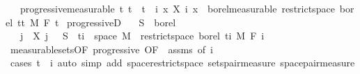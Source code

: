 \begin{isabellebody}
\ \ \ progressive{\isacharbrackleft}{\kern0pt}measurable{\isacharbrackright}{\kern0pt}{\isacharcolon}{\kern0pt}\ {\isachardoublequoteopen}{\isasymAnd}t{\isachardot}{\kern0pt}\ t\ {\isasymle}\ t\ {\isasymLongrightarrow}\ {\isacharparenleft}{\kern0pt}{\isasymlambda}{\isacharparenleft}{\kern0pt}i{\isacharcomma}{\kern0pt}\ x{\isacharparenright}{\kern0pt}{\isachardot}{\kern0pt}\ X\ i\ x{\isacharparenright}{\kern0pt}\ {\isasymin}\ borel{\isacharunderscore}{\kern0pt}measurable\ {\isacharparenleft}{\kern0pt}restrict{\isacharunderscore}{\kern0pt}space\ borel\ {\isacharbraceleft}{\kern0pt}tt{\isacharbraceright}{\kern0pt}\ {\isasymOtimes}\isactrlsub M\ F\ t{\isacharparenright}{\kern0pt}{\isachardoublequoteclose}\isanewline
{}\isanewline
\isanewline
{}\isamarkupfalse%
\ progressiveD{\isacharcolon}{\kern0pt}\isanewline
\ \ \ {\isachardoublequoteopen}S\ {\isasymin}\ borel{\isachardoublequoteclose}\isanewline
\ \ \ {\isachardoublequoteopen}{\isacharparenleft}{\kern0pt}{\isasymlambda}{\isacharparenleft}{\kern0pt}j{\isacharcomma}{\kern0pt}\ {\isasymxi}{\isacharparenright}{\kern0pt}{\isachardot}{\kern0pt}\ X\ j\ {\isasymxi}{\isacharparenright}{\kern0pt}\ {\isacharminus}{\kern0pt}{\isacharbackquote}{\kern0pt}\ S\ {\isasyminter}\ {\isacharparenleft}{\kern0pt}{\isacharbraceleft}{\kern0pt}ti{\isacharbraceright}{\kern0pt}\ {\isasymtimes}\ space\ M{\isacharparenright}{\kern0pt}\ {\isasymin}\ {\isacharparenleft}{\kern0pt}restrict{\isacharunderscore}{\kern0pt}space\ borel\ {\isacharbraceleft}{\kern0pt}ti{\isacharbraceright}{\kern0pt}\ {\isasymOtimes}\isactrlsub M\ F\ i{\isacharparenright}{\kern0pt}{\isachardoublequoteclose}\ \isanewline
%
\isadelimproof
\ \ %
\endisadelimproof
%
\isatagproof
{}\isamarkupfalse%
\ measurable{\isacharunderscore}{\kern0pt}sets{\isacharbrackleft}{\kern0pt}OF\ progressive{\isacharcomma}{\kern0pt}\ OF\ {\isacharunderscore}{\kern0pt}\ assms{\isacharcomma}{\kern0pt}\ of\ i{\isacharbrackright}{\kern0pt}\isanewline
\ \ \isamarkupfalse%
\ {\isacharparenleft}{\kern0pt}cases\ {\isachardoublequoteopen}t\ {\isasymle}\ i{\isachardoublequoteclose}{\isacharparenright}{\kern0pt}\ {\isacharparenleft}{\kern0pt}auto\ simp\ add{\isacharcolon}{\kern0pt}\ space{\isacharunderscore}{\kern0pt}restrict{\isacharunderscore}{\kern0pt}space\ sets{\isacharunderscore}{\kern0pt}pair{\isacharunderscore}{\kern0pt}measure\ space{\isacharunderscore}{\kern0pt}pair{\isacharunderscore}{\kern0pt}measure{\isacharparenright}{\kern0pt}%

\end{isabellebody}
